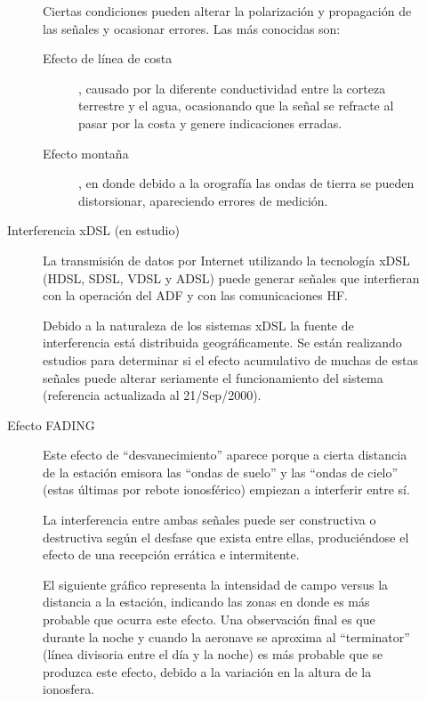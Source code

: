 \begin{description}
\begin{description}
Ciertas condiciones pueden alterar la polarizaci\'on y propagaci\'on de las se\~nales y ocasionar errores. Las m\'as conocidas son:

\begin{description}
\item [Efecto de l\'inea de costa], causado por la diferente conductividad entre la corteza terrestre y el agua, ocasionando que la se\~nal se refracte al pasar por la costa y genere indicaciones erradas.


\item [Efecto monta\~na], en donde debido a la orograf\'ia las ondas de tierra se pueden distorsionar, apareciendo errores de medici\'on.

\end{description}


\item [Interferencia xDSL (en estudio)]

La transmisi\'on de datos por Internet utilizando la tecnolog\'ia xDSL (HDSL, SDSL, VDSL y ADSL) puede generar se\~nales que interfieran con la operaci\'on del ADF y con las comunicaciones HF.

Debido a la naturaleza de los sistemas xDSL la fuente de interferencia est\'a distribuida geogr\'aficamente. Se est\'an realizando estudios para determinar si el efecto acumulativo de muchas de estas se\~nales puede alterar seriamente el funcionamiento del sistema (referencia actualizada al 21/Sep/2000).


\item [Efecto FADING]

Este efecto de ``desvanecimiento'' aparece porque a cierta distancia de la estaci\'on emisora las ``ondas de suelo'' y las ``ondas de cielo'' (estas \'ultimas por rebote ionosf\'erico) empiezan a interferir entre s\'i.
\vspace{10pt}

\begin{minipage}[b]{0.5\linewidth}
La interferencia entre ambas se\~nales puede ser constructiva o destructiva seg\'un el desfase que exista entre ellas, produci\'endose el efecto de una recepci\'on err\'atica e intermitente.

El siguiente gr\'afico representa la intensidad de campo versus la distancia a la estaci\'on, indicando las zonas en donde es m\'as probable que ocurra este efecto.
Una observaci\'on final es que durante la noche y cuando la aeronave se aproxima al ``terminator'' (l\'inea divisoria entre el d\'ia y la noche) es m\'as probable que se produzca este efecto, debido a la variaci\'on en la altura de la ionosfera.


\end{minipage}
\end{description}
\end{description}
